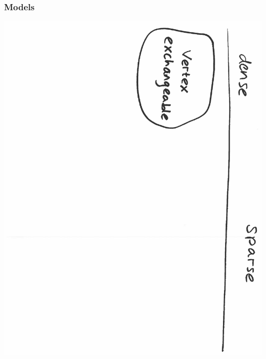 \documentclass[final,hyperref={pdfpagelabels=false},noamsthm]{beamer}
\begin{document}
\begin{frame}
	\frametitle{Models}
	\includegraphics[angle=90,origin=c,scale=0.4]{fig/models2}
\end{frame}
\end{document}
